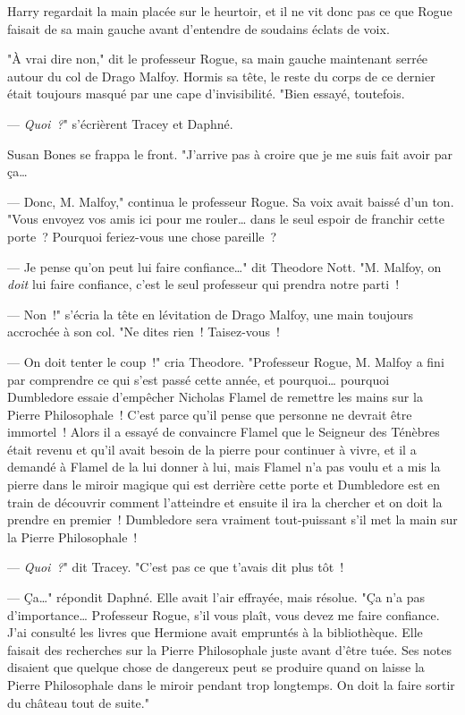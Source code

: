 Harry regardait la main placée sur le heurtoir, et il ne vit donc pas ce que Rogue faisait de sa main gauche avant d'entendre de soudains éclats de voix.

"À vrai dire non," dit le professeur Rogue, sa main gauche maintenant serrée autour du col de Drago Malfoy. Hormis sa tête, le reste du corps de ce dernier était toujours masqué par une cape d'invisibilité. "Bien essayé, toutefois.

--- \emph{Quoi~?}" s'écrièrent Tracey et Daphné.

Susan Bones se frappa le front. "J'arrive pas à croire que je me suis fait avoir par ça…

--- Donc, M. Malfoy," continua le professeur Rogue. Sa voix avait baissé d'un ton. "Vous envoyez vos amis ici pour me rouler… dans le seul espoir de franchir cette porte~? Pourquoi feriez-vous une chose pareille~?

--- Je pense qu'on peut lui faire confiance…" dit Theodore Nott. "M. Malfoy, on \emph{doit} lui faire confiance, c'est le seul professeur qui prendra notre parti~!

--- Non~!" s'écria la tête en lévitation de Drago Malfoy, une main toujours accrochée à son col. "Ne dites rien~! Taisez-vous~!

--- On doit tenter le coup~!" cria Theodore. "Professeur Rogue, M. Malfoy a fini par comprendre ce qui s'est passé cette année, et pourquoi… pourquoi Dumbledore essaie d'empêcher Nicholas Flamel de remettre les mains sur la Pierre Philosophale~! C'est parce qu'il pense que personne ne devrait être immortel~! Alors il a essayé de convaincre Flamel que le Seigneur des Ténèbres était revenu et qu'il avait besoin de la pierre pour continuer à vivre, et il a demandé à Flamel de la lui donner à lui, mais Flamel n'a pas voulu et a mis la pierre dans le miroir magique qui est derrière cette porte et Dumbledore est en train de découvrir comment l'atteindre et ensuite il ira la chercher et on doit la prendre en premier~! Dumbledore sera vraiment tout-puissant s'il met la main sur la Pierre Philosophale~!

--- \emph{Quoi~?}" dit Tracey. "C'est pas ce que t'avais dit plus tôt~!

--- Ça…" répondit Daphné. Elle avait l'air effrayée, mais résolue. "Ça n'a pas d'importance… Professeur Rogue, s'il vous plaît, vous devez me faire confiance. J'ai consulté les livres que Hermione avait empruntés à la bibliothèque. Elle faisait des recherches sur la Pierre Philosophale juste avant d'être tuée. Ses notes disaient que quelque chose de dangereux peut se produire quand on laisse la Pierre Philosophale dans le miroir pendant trop longtemps. On doit la faire sortir du château tout de suite."

